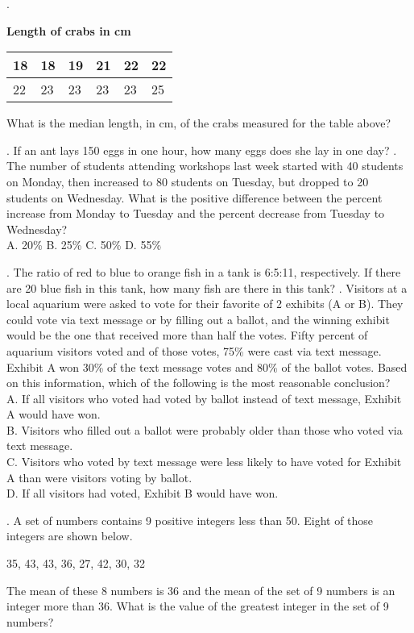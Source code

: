 \documentclass[../satmath.tex]{subfiles}
\begin{document}
\begin{enumerate}[label=\bfseries\arabic*.]
. 
\begin{center}
    \textbf{Length of crabs in cm}
\end{center}
\begin{table}[h]
    \centering
    \begin{tabular}{|l|l|l|l|l|l|}
    \hline
    18 & 18 & 19 & 21 & 22 & 22 \\ \hline
    22 & 23 & 23 & 23 & 23 & 25 \\ \hline
    \end{tabular}
\end{table}
What is the median length, in cm, of the crabs measured for the table above?

. If an ant lays 150 eggs in one hour, how many eggs does she lay in one day?
. The number of students attending workshops last week started with 40 students on Monday, then increased to 80 students on Tuesday, but dropped to 
20 students on Wednesday. What is the positive difference between the percent increase from Monday to Tuesday and the percent decrease from Tuesday to Wednesday?\\
A. 20\% \quad B. 25\% \quad C. 50\% \quad D. 55\%

. The ratio of red to blue to orange fish in a tank is 6:5:11, respectively. If there are 20 blue fish in this tank, how many fish are there in this tank?
. Visitors at a local aquarium were asked to vote for their favorite of 2 exhibits (A or B). They could vote via text message or by filling out a ballot, 
and the winning exhibit would be the one that received more than half the votes. Fifty percent of aquarium visitors voted and of those votes, 75\% 
were cast via text message. Exhibit A won 30\% of the text message votes and 80\% of the ballot votes. Based on this information, which of the following is the most 
reasonable conclusion?\\
A. If all visitors who voted had voted by ballot instead of text message, Exhibit A would have won.\\
B. Visitors who filled out a ballot were probably older than those who voted via text message.\\
C. Visitors who voted by text message were less likely to have voted for Exhibit A than were visitors voting by ballot.\\
D. If all visitors had voted, Exhibit B would have won.

. A set of numbers contains 9 positive integers less than 50. Eight of those integers are shown below.
\begin{center}
    35, 43, 43, 36, 27, 42, 30, 32
\end{center}
The mean of these 8 numbers is 36 and the mean of the set of 9 numbers is an integer more than 36. What is the value of the greatest integer in the set of 9 numbers?
\end{enumerate}
\end{document}
